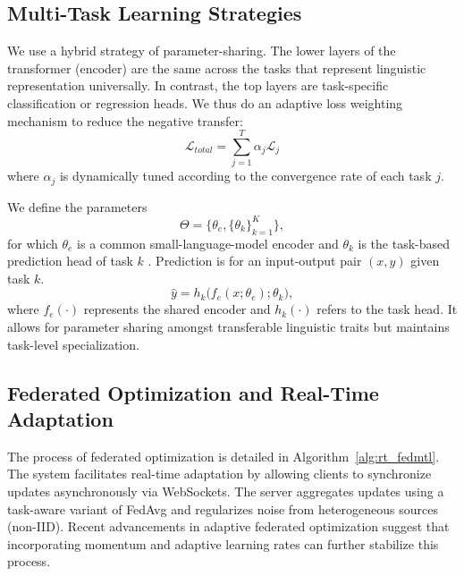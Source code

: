 \subsection{Multi-Task Learning Strategies}
We use a hybrid strategy of parameter-sharing. The lower layers of the transformer (encoder) are the same across the tasks that represent linguistic representation universally. In contrast, the top layers are task-specific classification or regression heads. We thus do an adaptive loss weighting mechanism to reduce the negative transfer:
\begin{equation}
    \mathcal{L}_{total} = \sum_{j=1}^{T} \alpha_j \mathcal{L}_j
\end{equation}
where $\alpha_j$ is dynamically tuned according to the convergence rate of each task $j$.

We define the parameters
\begin{equation}
\Theta = \{\theta_e, \{\theta_k\}_{k=1}^{K}\},
\end{equation}
for which $\theta_e$ is a common small-language-model encoder and $\theta_k$ is the task-based prediction head of task $k$ \cite{chen2024fedbone,zhou2025mfed,elbakary2025mira}. Prediction is for an input-output pair $(x,y)$ given task $k$.
\begin{equation}
\hat{y} = h_k\big(f_e(x;\theta_e);\theta_k\big),
\end{equation}
where $f_e(\cdot)$ represents the shared encoder and $h_k(\cdot)$ refers to the task head. It allows for parameter sharing amongst transferable linguistic traits but maintains task-level specialization.

\subsection{Federated Optimization and Real-Time Adaptation}
The process of federated optimization is detailed in Algorithm~\ref{alg:rt_fedmtl}. The system facilitates real-time adaptation by allowing clients to synchronize updates asynchronously via WebSockets. The server aggregates updates using a task-aware variant of FedAvg \cite{mcmahan2017fedavg} and regularizes noise from heterogeneous sources (non-IID). Recent advancements in adaptive federated optimization \cite{reddi2021adaptive} suggest that incorporating momentum and adaptive learning rates can further stabilize this process.

